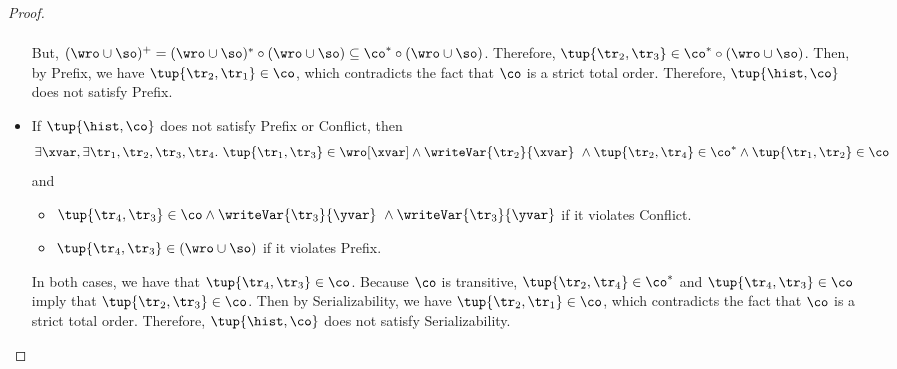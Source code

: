 \begin{proof}
\begin{itemize}
\begin{align*}
\end{align*}
   But, $(\wro\cup\so)^+ = (\wro\cup\so)^* \circ (\wro\cup\so) \subseteq \co^* \circ (\wro\cup\so)$. Therefore, $\tup{\tr_2,\tr_3}\in\co^* \circ (\wro\cup\so)$. Then, by \textsf{Prefix}, we have $\tup{\tr_2, \tr_1} \in \co$, which contradicts the fact that $\co$ is a strict total order. Therefore, $\tup{\hist, \co}$ does not satisfy \textsf{Prefix}.
   \item If $\tup{\hist, \co}$ does not satisfy \textsf{Prefix} or \textsf{Conflict}, then 
\begin{align*}
\exists \xvar, \exists \tr_1,\tr_2,\tr_3, \tr_4.\ \tup{\tr_1,\tr_3}\in \wro[\xvar] \land \writeVar{\tr_2}{\xvar}\ \land \tup{\tr_2,\tr_4}\in\co^* \land \tup{\tr_1,\tr_2}\in\co
\end{align*}
and 
       \begin{itemize}
         \item $\tup{\tr_4,\tr_3}\in \co \land \writeVar{\tr_3}{\yvar}\ \land \writeVar{\tr_3}{\yvar}$ if it violates \textsf{Conflict}.
         \item $\tup{\tr_4,\tr_3}\in (\wro \cup \so)$ if it violates \textsf{Prefix}.
       \end{itemize}
       
In both cases, we have that $\tup{\tr_4, \tr_3} \in \co$. Because $\co$ is transitive, $\tup{\tr_2, \tr_4} \in \co^*$ and $\tup{\tr_4, \tr_3} \in \co$ imply that $\tup{\tr_2, \tr_3} \in \co$. Then by \textsf{Serializability}, we have $\tup{\tr_2, \tr_1} \in \co$, which contradicts the fact that $\co$ is a strict total order. Therefore, $\tup{\hist, \co}$ does not satisfy \textsf{Serializability}.
 \end{itemize}
\end{proof}

